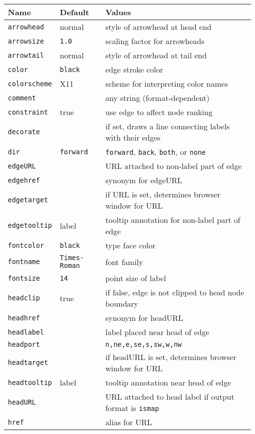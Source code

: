 \documentclass[11pt]{article}
\begin{document}
\begin{table}[p]
\begin{tabular}[t]{|l|l|p{3.5in}|} \hline
Name & Default & Values \\ \hline
{\tt arrowhead} & normal & style of arrowhead at head end \\
{\tt arrowsize} & {\tt 1.0} & scaling factor for arrowheads \\
{\tt arrowtail} & normal & style of arrowhead at tail end \\
{\tt color} & {\tt black} & edge stroke color \\
{\tt colorscheme} & X11 & scheme for interpreting color names \\
{\tt comment} & & any string (format-dependent) \\
{\tt constraint} & true & use edge to affect node ranking \\
{\tt decorate} & & if set, draws a line connecting labels with their edges \\
{\tt dir} & {\tt forward} & {\tt forward}, {\tt back}, {\tt both}, or {\tt none} \\ 
{\tt edgeURL} & & URL attached to non-label part of edge \\
{\tt edgehref} & & synonym for edgeURL \\
{\tt edgetarget} & & if URL is set, determines browser window for URL \\
{\tt edgetooltip} & label & tooltip annotation for non-label part of edge \\
{\tt fontcolor} & {\tt black} & type face color \\
{\tt fontname} & {\tt Times-Roman} & font family \\
{\tt fontsize} & {\tt 14} & point size of label \\
{\tt headclip} & true & if false, edge is not clipped to head node boundary \\
{\tt headhref} & & synonym for headURL \\
{\tt headlabel} & & label placed near head of edge \\
{\tt headport} & & {\tt n,ne,e,se,s,sw,w,nw}\\
{\tt headtarget} & & if headURL is set, determines browser window for URL \\
{\tt headtooltip} & label & tooltip annotation near head of edge \\
{\tt headURL} & & URL attached to head label if output format is {\tt ismap} \\
{\tt href} & & alias for URL \\

\end{tabular}
\end{table}
\end{document}
